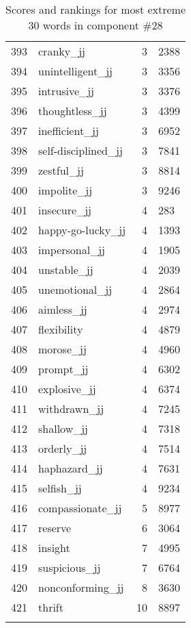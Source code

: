 \begin{longtable}[!htbp]{| rlr@{.}l |}
    393 & cranky\_jj & 3 & 2388 \\
    394 & unintelligent\_jj & 3 & 3356 \\
    395 & intrusive\_jj & 3 & 3376 \\
    396 & thoughtless\_jj & 3 & 4399 \\
    397 & inefficient\_jj & 3 & 6952 \\
    398 & self-disciplined\_jj & 3 & 7841 \\
    399 & zestful\_jj & 3 & 8814 \\
    400 & impolite\_jj & 3 & 9246 \\
    401 & insecure\_jj & 4 & 283 \\
    402 & happy-go-lucky\_jj & 4 & 1393 \\
    403 & impersonal\_jj & 4 & 1905 \\
    404 & unstable\_jj & 4 & 2039 \\
    405 & unemotional\_jj & 4 & 2864 \\
    406 & aimless\_jj & 4 & 2974 \\
    407 & flexibility & 4 & 4879 \\
    408 & morose\_jj & 4 & 4960 \\
    409 & prompt\_jj & 4 & 6302 \\
    410 & explosive\_jj & 4 & 6374 \\
    411 & withdrawn\_jj & 4 & 7245 \\
    412 & shallow\_jj & 4 & 7318 \\
    413 & orderly\_jj & 4 & 7514 \\
    414 & haphazard\_jj & 4 & 7631 \\
    415 & selfish\_jj & 4 & 9234 \\
    416 & compassionate\_jj & 5 & 8977 \\
    417 & reserve & 6 & 3064 \\
    418 & insight & 7 & 4995 \\
    419 & suspicious\_jj & 7 & 6764 \\
    420 & nonconforming\_jj & 8 & 3630 \\
    421 & thrift & 10 & 8897 \\
    \hline
    \caption{Scores and rankings for most extreme 30 words in component \#28} \\
\end{longtable}
